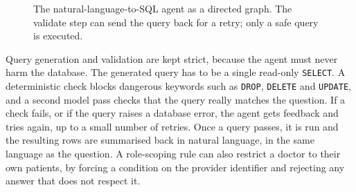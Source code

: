 \begin{figure}[t]
\centering
{}
\caption{The natural-language-to-SQL agent as a directed graph. The validate step can send the query back for a retry; only a safe query is executed.}
\label{fig:agent}
\end{figure}

Query generation and validation are kept strict, because the agent must never harm the database. The generated query has to be a single read-only \texttt{SELECT}. A deterministic check blocks dangerous keywords such as \texttt{DROP}, \texttt{DELETE} and \texttt{UPDATE}, and a second model pass checks that the query really matches the question. If a check fails, or if the query raises a database error, the agent gets feedback and tries again, up to a small number of retries. Once a query passes, it is run and the resulting rows are summarised back in natural language, in the same language as the question. A role-scoping rule can also restrict a doctor to their own patients, by forcing a condition on the provider identifier and rejecting any answer that does not respect it.
